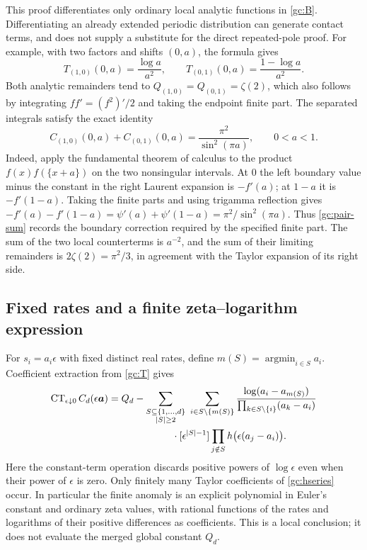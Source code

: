 This proof differentiates only ordinary local analytic functions in
\eqref{gc:B}.  Differentiating an already extended periodic distribution
can generate contact terms, and does not supply a substitute for the
direct repeated-pole proof.  For example, with two factors and shifts
$(0,a)$, the formula gives
\[
 T_{(1,0)}(0,a)=\frac{\log a}{a^2},\qquad
 T_{(0,1)}(0,a)=\frac{1-\log a}{a^2}.
\]
Both analytic remainders tend to
$Q_{(1,0)}=Q_{(0,1)}=\zeta(2)$, which also follows by integrating
$ff'=(f^2)'/2$ and taking the endpoint finite part.
The separated integrals satisfy the exact identity
\begin{equation}\label{gc:pair-sum}
 C_{(1,0)}(0,a)+C_{(0,1)}(0,a)
   =\frac{\pi^2}{\sin^2(\pi a)},\qquad 0<a<1.
\end{equation}
Indeed, apply the fundamental theorem of calculus to the product
$f(x)f(\{x+a\})$ on the two nonsingular intervals.  At $0$ the left
boundary value minus the constant in the right Laurent expansion is
$-f'(a)$; at $1-a$ it is $-f'(1-a)$.  Taking the finite parts and using
trigamma reflection gives
$-f'(a)-f'(1-a)=\psi'(a)+\psi'(1-a)=\pi^2/\sin^2(\pi a)$.
Thus \eqref{gc:pair-sum} records the boundary correction required by the
specified finite part.  The sum of the two local counterterms is $a^{-2}$,
and the sum of their limiting remainders is $2\zeta(2)=\pi^2/3$, in
agreement with the Taylor expansion of its right side.

\subsection{Fixed rates and a finite zeta--logarithm expression}
For $s_i=a_i\epsilon$ with fixed distinct real rates, define
$m(S)=\operatorname*{argmin}_{i\in S}a_i$.  Coefficient extraction from
\eqref{gc:T} gives
\begin{align}\label{gc:fixed-constant}
 \operatorname{CT}_{\epsilon\downarrow0}C_d(\epsilon\boldsymbol a)
 ={}&Q_d-\sum_{\substack{S\subseteq\{1,\ldots,d\}\\ |S|\ge2}}
 \ \sum_{i\in S\setminus\{m(S)\}}
 \frac{\log(a_i-a_{m(S)})}
      {\prod_{k\in S\setminus\{i\}}(a_k-a_i)}\notag\\
 &\hspace{18mm}\cdot
 [\epsilon^{|S|-1}]
       \prod_{j\notin S}h\bigl(\epsilon(a_j-a_i)\bigr).
\end{align}
Here the constant-term operation discards positive powers of
$\log\epsilon$ even when their power of $\epsilon$ is zero.  Only finitely
many Taylor coefficients of \eqref{gc:hseries} occur.  In particular the
finite anomaly is an explicit polynomial in Euler's constant and ordinary
zeta values, with rational functions of the rates and logarithms of their
positive differences as coefficients.  This is a local conclusion; it
does not evaluate the merged global constant $Q_d$.

